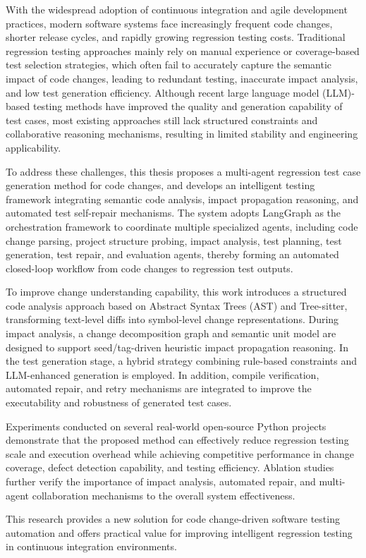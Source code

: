 \begin{abstractEn}
With the widespread adoption of continuous integration and agile development practices, modern software systems face increasingly frequent code changes, shorter release cycles, and rapidly growing regression testing costs. Traditional regression testing approaches mainly rely on manual experience or coverage-based test selection strategies, which often fail to accurately capture the semantic impact of code changes, leading to redundant testing, inaccurate impact analysis, and low test generation efficiency. Although recent large language model (LLM)-based testing methods have improved the quality and generation capability of test cases, most existing approaches still lack structured constraints and collaborative reasoning mechanisms, resulting in limited stability and engineering applicability.

To address these challenges, this thesis proposes a multi-agent regression test case generation method for code changes, and develops an intelligent testing framework integrating semantic code analysis, impact propagation reasoning, and automated test self-repair mechanisms. The system adopts LangGraph as the orchestration framework to coordinate multiple specialized agents, including code change parsing, project structure probing, impact analysis, test planning, test generation, test repair, and evaluation agents, thereby forming an automated closed-loop workflow from code changes to regression test outputs.

To improve change understanding capability, this work introduces a structured code analysis approach based on Abstract Syntax Trees (AST) and Tree-sitter, transforming text-level diffs into symbol-level change representations. During impact analysis, a change decomposition graph and semantic unit model are designed to support seed/tag-driven heuristic impact propagation reasoning. In the test generation stage, a hybrid strategy combining rule-based constraints and LLM-enhanced generation is employed. In addition, compile verification, automated repair, and retry mechanisms are integrated to improve the executability and robustness of generated test cases.

Experiments conducted on several real-world open-source Python projects demonstrate that the proposed method can effectively reduce regression testing scale and execution overhead while achieving competitive performance in change coverage, defect detection capability, and testing efficiency. Ablation studies further verify the importance of impact analysis, automated repair, and multi-agent collaboration mechanisms to the overall system effectiveness.

This research provides a new solution for code change-driven software testing automation and offers practical value for improving intelligent regression testing in continuous integration environments.
\end{abstractEn}
